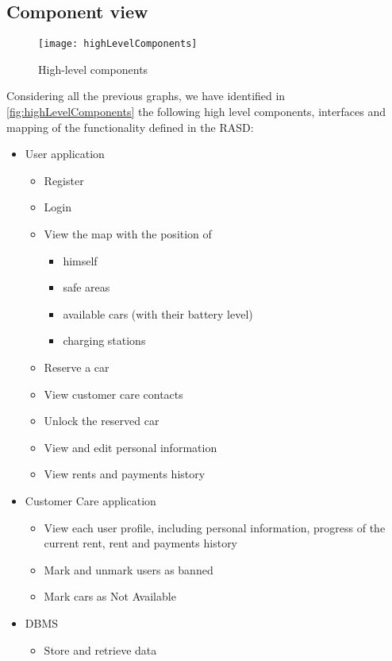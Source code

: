 \subsection{Component view}
\begin{figure}[h]
	\centering
	\texttt{[image: highLevelComponents]}
	\caption{
		\label{fig:highLevelComponents} 
		High-level components
	}
\end{figure}
Considering all the previous graphs, we have identified in \autoref{fig:highLevelComponents} the following high level components, interfaces and mapping of the functionality defined in the RASD:
\begin{itemize}

	\item User application
	\begin{itemize}
		\item Register
		\item Login
		\item View the map with the position of
		\begin{itemize}
			\item himself
			\item safe areas
			\item available cars (with their battery level)
			\item charging stations
		\end{itemize}
		\item Reserve a car
		\item View customer care contacts
		\item Unlock the reserved car
		\item View and edit personal information
		\item View rents and payments history
	\end{itemize}
	
	\item Customer Care application
	\begin{itemize}
		\item View each user profile, including personal information, progress of the current rent, rent and payments history
		\item Mark and unmark users as banned
		\item Mark cars as Not Available
	\end{itemize}
	
	\item DBMS
	\begin{itemize}
		\item Store and retrieve data
	\end{itemize}	
	

\end{itemize}

